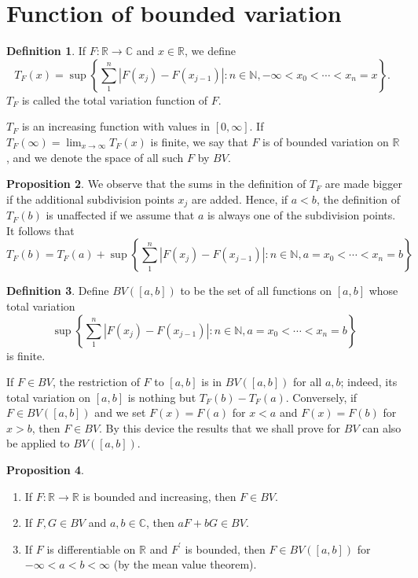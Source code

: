 \documentclass[12pt,a4paper]{book}
\newenvironment{enu}{\begin{enumerate}[(1)]}{\end{enumerate}}
\theoremstyle{definition}
\newtheorem{defn}{Definition}[section]
\newtheorem{prop}[defn]{Proposition}
\begin{document}
\section{Function of bounded variation}
\begin{defn}
    If $F: \mathbb{R} \rightarrow \mathbb{C}$ and $x \in \mathbb{R}$, we define
    $$
        T_F(x)=\sup \left\{\sum_1^n\left|F\left(x_j\right)-F\left(x_{j-1}\right)\right|: n \in \mathbb{N},-\infty<x_0<\cdots<x_n=x\right\} \text {. }
    $$
    $T_F$ is called the total variation function of $F$.

    $T_F$ is an increasing function with values in $[0, \infty]$. If $T_F(\infty)=\lim _{x \rightarrow \infty} T_F(x)$ is finite, we say that $F$ is of bounded variation on $\mathbb{R}$, and we denote the space of all such $F$ by $B V$.
\end{defn}
\begin{prop}
    We observe that the sums in the definition of $T_F$ are made bigger if the additional subdivision points $x_j$ are added. Hence, if $a<b$, the definition of $T_F(b)$ is unaffected if we assume that $a$ is always one of the subdivision points. It follows that
    \begin{equation*}
        T_F(b)=T_F(a)+\sup \left\{\sum_1^n\left|F\left(x_j\right)-F\left(x_{j-1}\right)\right|: n \in \mathbb{N}, a=x_0<\cdots<x_n=b\right\}
    \end{equation*}
\end{prop}
\begin{defn}
    Define $BV([a, b])$ to be the set of all functions on $[a, b]$ whose total variation
    $$\sup \left\{\sum_1^n\left|F\left(x_j\right)-F\left(x_{j-1}\right)\right|: n \in \mathbb{N}, a=x_0<\cdots<x_n=b\right\}$$
    is finite.

    If $F \in B V$, the restriction of $F$ to $[a, b]$ is in $B V([a, b])$ for all $a, b$; indeed, its total variation on $[a, b]$ is nothing but $T_F(b)-T_F(a)$. Conversely,
    if $F \in B V([a, b])$ and we set $F(x)=F(a)$ for $x<a$ and $F(x)=F(b)$ for $x>b$, then $F \in B V$. By this device the results that we shall prove for $B V$ can also be applied to $B V([a, b])$.
\end{defn}
\begin{prop}
    \begin{enu}
        \item If $F: \mathbb{R} \rightarrow \mathbb{R}$ is bounded and increasing, then $F \in B V$.
        \item If $F, G \in B V$ and $a, b \in \mathbb{C}$, then $a F+b G \in B V$.
        \item If $F$ is differentiable on $\mathbb{R}$ and $F^{\prime}$ is bounded, then $F \in B V([a, b])$ for $-\infty<a<b<\infty$ (by the mean value theorem).
    \end{enu}
\end{prop}
\end{document}
